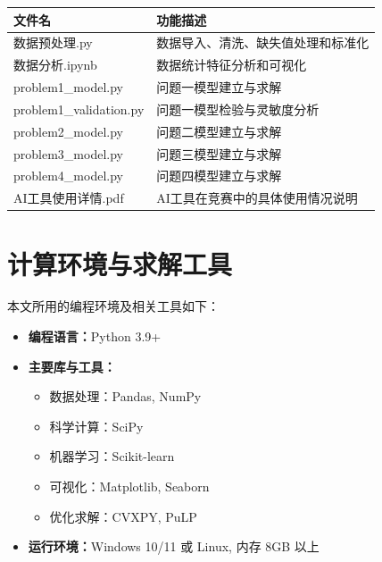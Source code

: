 \documentclass[withoutpreface,bwprint]{cumcmthesis}
\renewcommand{\textbf}[1]{{\song\bfseries #1}}
\begin{document}
\begin{table}[H]
	\centering
	\begin{tabularx}{\textwidth}{L|L}
		\toprule
		\textbf{文件名} & \textbf{功能描述} \\
		\midrule
		数据预处理.py & 数据导入、清洗、缺失值处理和标准化 \\
		数据分析.ipynb & 数据统计特征分析和可视化 \\

		problem1\_model.py & 问题一模型建立与求解 \\
		problem1\_validation.py & 问题一模型检验与灵敏度分析 \\

		problem2\_model.py & 问题二模型建立与求解 \\

		problem3\_model.py & 问题三模型建立与求解 \\

		problem4\_model.py & 问题四模型建立与求解 \\

		AI工具使用详情.pdf & AI工具在竞赛中的具体使用情况说明 \\

		\bottomrule
	\end{tabularx}
	\label{tab:文件列表}
\end{table}

\section{计算环境与求解工具}

\noindent 本文所用的编程环境及相关工具如下：

\begin{itemize}
	\item \textbf{编程语言：}Python 3.9+
	\item \textbf{主要库与工具：}
	\begin{itemize}
		\item 数据处理：Pandas, NumPy
		\item 科学计算：SciPy
		\item 机器学习：Scikit-learn
		\item 可视化：Matplotlib, Seaborn
		\item 优化求解：CVXPY, PuLP
	\end{itemize}
	\item \textbf{运行环境：}Windows 10/11 或 Linux, 内存 8GB 以上
\end{itemize}
\end{document}
